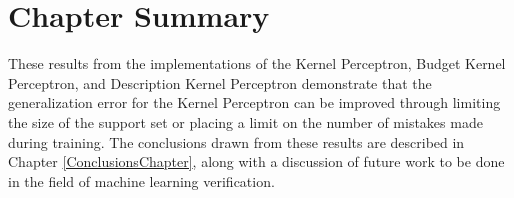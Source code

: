 \section{Chapter Summary}\label{ResultsChapterSummarySection}
These results from the implementations of the Kernel Perceptron, Budget Kernel Perceptron, and Description Kernel Perceptron demonstrate that the generalization error for the Kernel Perceptron can be improved through limiting the size of the support set or placing a limit on the number of mistakes made during training. The conclusions drawn from these results are described in Chapter \ref{ConclusionsChapter}, along with a discussion of future work to be done in the field of machine learning verification.
